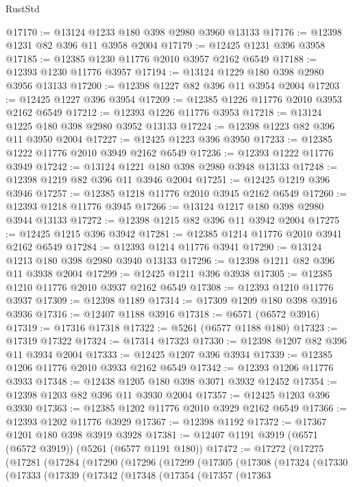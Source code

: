 \begin{lexlean}{RustStd}
\begin{coremodule}
@17170 := @13124 @1233 @180 @398 @2980 @3960 @13133
@17176 := @12398 @1231 @82 @396 @11 @3958 @2004
@17179 := @12425 @1231 @396 @3958
@17185 := @12385 @1230 @11776 @2010 @3957 @2162 @6549
@17188 := @12393 @1230 @11776 @3957
@17194 := @13124 @1229 @180 @398 @2980 @3956 @13133
@17200 := @12398 @1227 @82 @396 @11 @3954 @2004
@17203 := @12425 @1227 @396 @3954
@17209 := @12385 @1226 @11776 @2010 @3953 @2162 @6549
@17212 := @12393 @1226 @11776 @3953
@17218 := @13124 @1225 @180 @398 @2980 @3952 @13133
@17224 := @12398 @1223 @82 @396 @11 @3950 @2004
@17227 := @12425 @1223 @396 @3950
@17233 := @12385 @1222 @11776 @2010 @3949 @2162 @6549
@17236 := @12393 @1222 @11776 @3949
@17242 := @13124 @1221 @180 @398 @2980 @3948 @13133
@17248 := @12398 @1219 @82 @396 @11 @3946 @2004
@17251 := @12425 @1219 @396 @3946
@17257 := @12385 @1218 @11776 @2010 @3945 @2162 @6549
@17260 := @12393 @1218 @11776 @3945
@17266 := @13124 @1217 @180 @398 @2980 @3944 @13133
@17272 := @12398 @1215 @82 @396 @11 @3942 @2004
@17275 := @12425 @1215 @396 @3942
@17281 := @12385 @1214 @11776 @2010 @3941 @2162 @6549
@17284 := @12393 @1214 @11776 @3941
@17290 := @13124 @1213 @180 @398 @2980 @3940 @13133
@17296 := @12398 @1211 @82 @396 @11 @3938 @2004
@17299 := @12425 @1211 @396 @3938
@17305 := @12385 @1210 @11776 @2010 @3937 @2162 @6549
@17308 := @12393 @1210 @11776 @3937
@17309 := @12398 @1189
@17314 := @17309 @1209 @180 @398 @3916 @3936
@17316 := @12407 @1188 @3916
@17318 := @6571 (@6572 @3916)
@17319 := @17316 @17318
@17322 := @5261 (@6577 @1188 @180)
@17323 := @17319 @17322
@17324 := @17314 @17323
@17330 := @12398 @1207 @82 @396 @11 @3934 @2004
@17333 := @12425 @1207 @396 @3934
@17339 := @12385 @1206 @11776 @2010 @3933 @2162 @6549
@17342 := @12393 @1206 @11776 @3933
@17348 := @12438 @1205 @180 @398 @3071 @3932 @12452
@17354 := @12398 @1203 @82 @396 @11 @3930 @2004
@17357 := @12425 @1203 @396 @3930
@17363 := @12385 @1202 @11776 @2010 @3929 @2162 @6549
@17366 := @12393 @1202 @11776 @3929
@17367 := @12398 @1192
@17372 := @17367 @1201 @180 @398 @3919 @3928
@17381 := @12407 @1191 @3919 (@6571 (@6572 @3919)) (@5261 (@6577 @1191 @180))
@17472 := @17272
    (@17275
      (@17281
        (@17284
          (@17290
            (@17296
              (@17299
                (@17305
                  (@17308
                    (@17324
                      (@17330
                        (@17333
                          (@17339
                            (@17342
                              (@17348
                                (@17354
                                  (@17357
                                    (@17363

\end{coremodule}
\end{lexlean}
